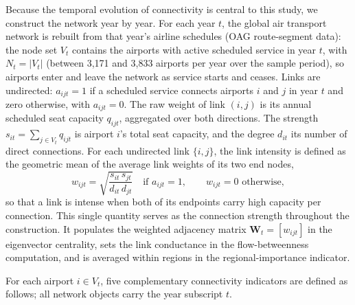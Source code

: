 Because the temporal evolution of connectivity is central to this study, we construct the network year by year. For each year $t$,  the global air transport network is rebuilt from that year's airline schedules (OAG route-segment data): the node set $V_t$ contains the airports with active scheduled service in year $t$, with $N_t=|V_t|$ (between 3{,}171 and 3{,}833 airports per year over the sample period), so airports enter and leave the network as service starts and ceases. Links are undirected: $a_{ijt}=1$ if a scheduled service connects airports $i$ and $j$ in year $t$ and zero otherwise, with $a_{ijt}=0$. The raw weight of link $(i,j)$ is its annual scheduled seat capacity $q_{ijt}$, aggregated over both directions. The strength $s_{it}=\sum_{j\in V_t} q_{ijt}$ is airport $i$'s total seat capacity, and the degree $d_{it}$ its number of direct connections. For each undirected link $\{i,j\}$, the link intensity is defined as the geometric mean of the average link weights of its two end nodes,
\begin{equation}
    w_{ijt}
    =
    \sqrt{\frac{s_{it}\,s_{jt}}{d_{it}\,d_{jt}}}
    \quad\text{if } a_{ijt}=1,
    \qquad w_{ijt}=0 \text{ otherwise},
    \label{eq:gaci_link_intensity}
\end{equation}
so that a link is intense when both of its endpoints carry high capacity per connection. This single quantity serves as the connection strength throughout the construction. It populates the weighted adjacency matrix $\mathbf{W}_t=[w_{ijt}]$ in the eigenvector centrality, sets the link conductance in the flow-betweenness computation, and is averaged within regions in the regional-importance indicator.

For each airport $i \in V_t$, five complementary connectivity indicators are defined as follows; all network objects carry the year subscript $t$.

